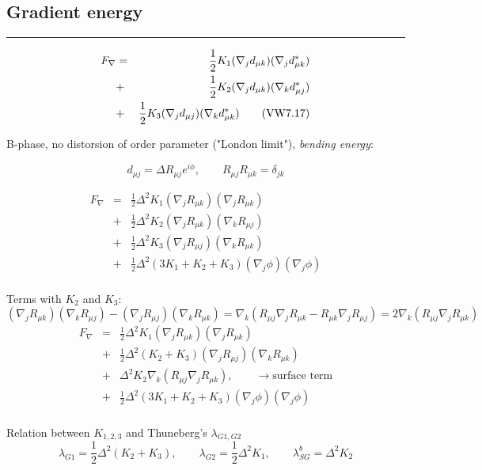 \documentclass[a4paper]{article}
\begin{document}
\subsection*{Gradient energy}

\hrule

\begin{eqnarray*}
F_\nabla
&=& \frac12 K_1 (\nabla_j d_{\mu k})(\nabla_j d^*_{\mu k})\\
&+& \frac12 K_2 (\nabla_j d_{\mu k})(\nabla_k d^*_{\mu j})\\
&+& \frac12 K_3 (\nabla_j d_{\mu j})(\nabla_k d^*_{\mu k})
\qquad{\rm\small (VW 7.17)}\\
\end{eqnarray*}

B-phase, no distorsion of order parameter ("London limit"),
{\it bending energy}:

$$
d_{\mu j}=\Delta R_{\mu j} e^{i\phi},\qquad
R_{\mu j} R_{\mu k} = \delta_{jk}
$$

\begin{eqnarray*}
F_\nabla
&=& \frac12 \Delta^2 K_1
 (\nabla_j R_{\mu k})(\nabla_j R_{\mu k})\\
&+& \frac12 \Delta^2 K_2
 (\nabla_j R_{\mu k})(\nabla_k R_{\mu j})\\
&+& \frac12 \Delta^2 K_3
 (\nabla_j R_{\mu j})(\nabla_k R_{\mu k})\\
&+& \frac12 \Delta^2 (3K_1+K_2+K_3)
 (\nabla_j \phi)(\nabla_j \phi)\\
\end{eqnarray*}

Terms with $K_2$ and $K_3$:
$$
(\nabla_j R_{\mu k})(\nabla_k R_{\mu j}) - (\nabla_j R_{\mu j})(\nabla_k R_{\mu k}) =
\nabla_k(R_{\mu j} \nabla_j R_{\mu k} - R_{\mu k} \nabla_j R_{\mu j}) =
2\nabla_k(R_{\mu j} \nabla_j R_{\mu k})
$$
\begin{eqnarray*}
F_\nabla
&=& \frac12\Delta^2 K_1 (\nabla_j R_{\mu k})(\nabla_j R_{\mu k})\\
&+& \frac12\Delta^2 (K_2+K_3) (\nabla_j R_{\mu j})(\nabla_k R_{\mu k})\\
&+& \Delta^2 K_2 \nabla_k(R_{\mu j} \nabla_j R_{\mu k}),\qquad
\rightarrow \mbox{surface term}\\
&+& \frac12 \Delta^2 (3K_1+K_2+K_3)
 (\nabla_j \phi)(\nabla_j \phi)\\
\end{eqnarray*}

Relation between $K_{1,2,3}$ and Thuneberg's $\lambda_{G1,G2}$
$$
\lambda_{G1} = \frac12\Delta^2 (K_2+K_3),\qquad
\lambda_{G2} = \frac12\Delta^2 K_1,\qquad
\lambda_{SG}^b = \Delta^2 K_2
$$
\end{document}
